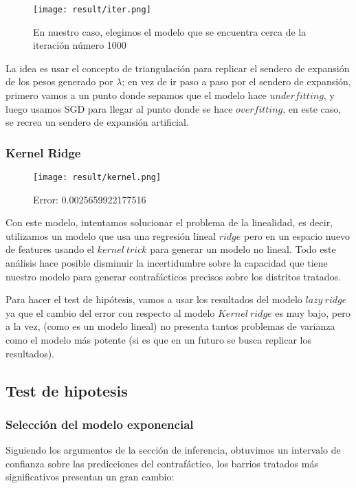 \documentclass[12pt]{article}
\begin{document}
\begin{figure}[H]
\centering
\texttt{[image: result/iter.png]}
\caption{En nuestro caso, elegimos el modelo que se encuentra cerca de la iteración número 1000}
\end{figure}

La idea es usar el concepto de triangulación para replicar el sendero de expansión de los pesos generado por {$\lambda$}; en vez de ir paso a paso por el sendero de expansión, primero vamos a un punto donde sepamos que el modelo hace {$underfitting$}, y luego usamos SGD para llegar al punto donde se hace {$overfitting$}, en este caso, se recrea un sendero de expansión artificial.

\subsubsection{Kernel Ridge}

\begin{figure}[H]
\centering
\texttt{[image: result/kernel.png]}
\caption*{Error: 0.0025659922177516}
\end{figure}

Con este modelo, intentamos solucionar el problema de la linealidad, es decir, utilizamos un modelo que usa una regresión lineal {$ridge$} pero en un espacio nuevo de features usando el {$kernel \  trick$} para generar un modelo no lineal. Todo este análisis hace posible disminuir la incertidumbre sobre la capacidad que tiene nuestro modelo para generar contrafácticos precisos sobre los distritos tratados. 

Para hacer el test de hipótesis, vamos a usar los resultados del modelo {$lazy \ ridge$} ya que el cambio del error con respecto al modelo {$Kernel \ ridge$} es muy bajo, pero a la vez, (como es un modelo lineal) no presenta tantos problemas de varianza como el modelo más potente (si es que en un futuro se busca replicar los resultados).
\subsection{Test de hipotesis}
\subsubsection{Selección del modelo exponencial}
Siguiendo los argumentos de la sección de inferencia, obtuvimos un intervalo de confianza sobre las predicciones del contrafáctico, los barrios tratados más significativos presentan un gran cambio:
\end{document}

